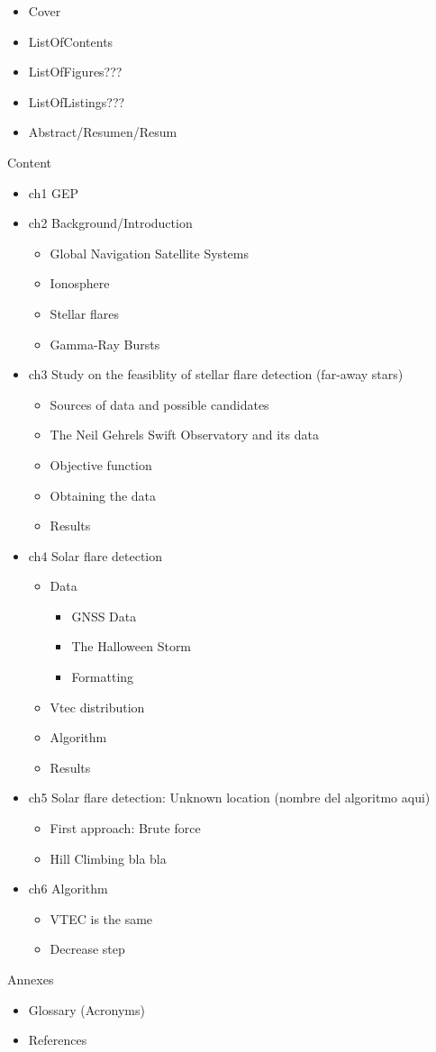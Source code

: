 \begin{itemize}
	\item Cover
	\item ListOfContents
	\item ListOfFigures???
	\item ListOfListings???
	\item Abstract/Resumen/Resum
\end{itemize} 

Content

\begin{itemize}
	\item ch1 GEP
	\item ch2 Background/Introduction
	\begin{itemize}
		\item Global Navigation Satellite Systems
		\item Ionosphere
		\item Stellar flares
		\item  Gamma-Ray Bursts
	\end{itemize}
	\item ch3 Study on the feasiblity of stellar flare detection (far-away stars)
	\begin{itemize}
		\item Sources of data and possible candidates
		\item The Neil Gehrels Swift Observatory and its data 
		\item Objective function
		\item Obtaining the data
		\item Results
	\end{itemize}
	\item ch4 Solar flare detection
	\begin{itemize}
		\item Data
		\begin{itemize}
			\item GNSS Data
			\item The Halloween Storm
			\item Formatting
		\end{itemize}
		\item Vtec distribution
		\item Algorithm
		\item Results
	\end{itemize}
	\item ch5 Solar flare detection: Unknown location (nombre del algoritmo aqui)
	\begin{itemize}
		\item First approach: Brute force
		\item Hill Climbing bla bla
	\end{itemize}
	\item ch6 Algorithm
	\begin{itemize}
		\item VTEC is the same
		\item Decrease step
	\end{itemize}
\end{itemize}

Annexes

\begin{itemize}
	\item Glossary (Acronyms)
	\item References
\end{itemize}


